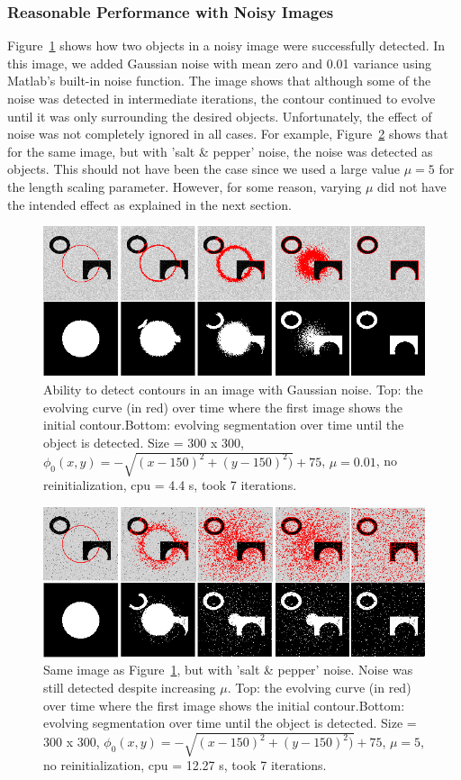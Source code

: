 \documentclass[10pt,journal,letterpaper,compsoc]{IEEEtran}
\begin{document}
\subsubsection*{Reasonable Performance with Noisy Images}

Figure~\ref{fig:cv_eg10} shows how two objects in a noisy image were successfully detected. In this image, we added Gaussian noise with mean zero and 0.01
variance using Matlab's built-in noise function. The image shows that although some of the noise was detected in intermediate iterations, the contour continued
to evolve until it was only surrounding the desired objects. Unfortunately, the effect of noise was not completely ignored in all cases. For example,
Figure~\ref{fig:cv_eg11} shows that for the same image, but with 'salt \& pepper' noise, the noise was detected as objects. This should not have been the case
since we used a large value $\mu = 5$ for the length scaling parameter. However, for some reason, varying $\mu$ did not have the intended effect as explained
in the next section. 

\begin{figure}[t]
\centering
\includegraphics[width=12cm]{cv_eg10.png}
\caption{Ability to detect contours in an image with Gaussian noise.  Top: the evolving curve (in red) over time where the first
image shows the initial
contour.Bottom: evolving segmentation over time until the object is detected. Size = 300 x 300, $\phi_{0}(x,y) = - \sqrt{(x - 150)^2 + (y - 150)^2)} +
75$, $\mu =0.01$, no reinitialization, cpu = 4.4 s, took 7 iterations.}
\label{fig:cv_eg10}
\end{figure}

\begin{figure}[t]
\centering
\includegraphics[width=12cm]{cv_eg11.png}
\caption{Same image as Figure~\ref{fig:cv_eg10}, but with 'salt \& pepper' noise. Noise was still detected despite increasing $\mu$.  Top: the evolving curve
(in red) over time where the first
image shows the initial
contour.Bottom: evolving segmentation over time until the object is detected. Size = 300 x 300, $\phi_{0}(x,y) = - \sqrt{(x - 150)^2 + (y - 150)^2)} +
75$, $\mu = 5$, no reinitialization, cpu = 12.27 s, took 7 iterations.}
\label{fig:cv_eg11}
\end{figure}
\end{document}
